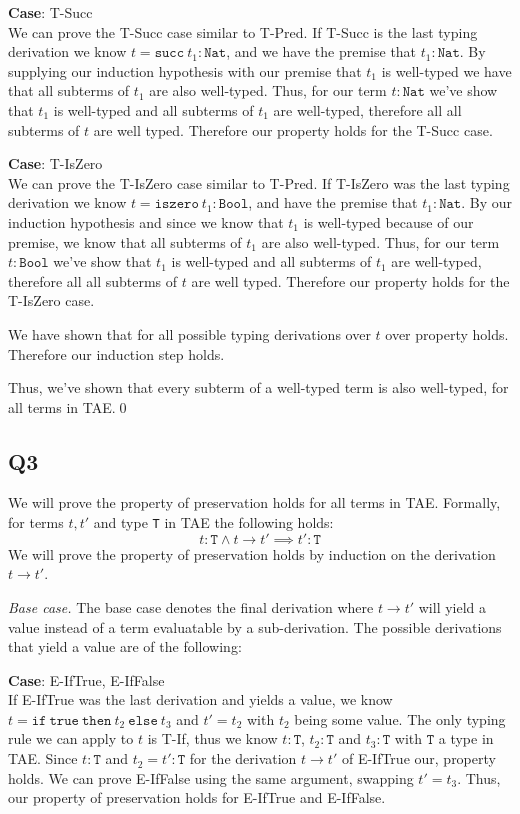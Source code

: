 \documentclass[12pt, fleqn]{article}
\begin{document}
\medskip
\textbf{Case}: T-Succ\\
We can prove the T-Succ case similar to T-Pred. If T-Succ is the last typing derivation we know $t = \texttt{succ}~t_1
 : \texttt{Nat}$, and we have the premise that $t_1 : \texttt{Nat}$. By supplying our induction hypothesis with
our premise that $t_1$ is well-typed we have that all subterms of $t_1$ are also well-typed. 
Thus, for our term $t : \texttt{Nat}$ we've show that $t_1$ is well-typed and all subterms of $t_1$ are 
well-typed, therefore all all subterms of $t$ are well typed.
Therefore our property holds for the T-Succ case.

\medskip
\textbf{Case}: T-IsZero\\
We can prove the T-IsZero case similar to T-Pred. If T-IsZero was the last typing derivation we know $t = \texttt{iszero}~t_1
 : \texttt{Bool}$, and have the premise that $t_1 : \texttt{Nat}$. By our induction hypothesis and since we 
know that $t_1$ is well-typed because of our premise, we know that all subterms of $t_1$ are also well-typed. 
Thus, for our term $t : \texttt{Bool}$ we've show that $t_1$ is well-typed and all subterms of $t_1$ are 
well-typed, therefore all all subterms of $t$ are well typed.
Therefore our property holds for the T-IsZero case.

\medskip
We have shown that for all possible typing derivations over $t$ over property holds. Therefore our induction step holds.

\medskip
Thus, we've shown that every subterm of a well-typed term is also well-typed, for all terms in TAE.\qed

\subsection{Q3}
We will prove the property of preservation holds for all terms in TAE. Formally, for terms $t, t'$ and type
\verb|T| in TAE the following holds:
$$t : \texttt{T} \land t \rightarrow t' \implies t' : \texttt{T}$$
We will prove the property of preservation holds by induction on the derivation $t \rightarrow t'$.

\medskip
\emph{Base case.} The base case denotes the final derivation where $t \rightarrow t'$ will yield a value instead
of a term evaluatable by a sub-derivation. The possible derivations that yield a value are of the following:

\medskip
\textbf{Case}: E-IfTrue, E-IfFalse\\
If E-IfTrue was the last derivation and yields a value, we know $t = \texttt{if}\:\texttt{true}\:\texttt{then}\:
t_2\:\texttt{else}\:t_3$ and $t' = t_2$ with $t_2$ being some value. The only typing rule we can apply to $t$ is
T-If, thus we know $t : \texttt{T}$, $t_2 : \texttt{T}$ and $t_3 : \texttt{T}$ with $\texttt{T}$ a type in TAE. Since
$t : \texttt{T}$ and $t_2 = t' : \texttt{T}$ for the derivation $t \rightarrow t'$ of E-IfTrue our, property holds.
We can prove E-IfFalse using the same argument, swapping $t' = t_3$. Thus, our property of preservation holds for E-IfTrue
and E-IfFalse.
\end{document}
